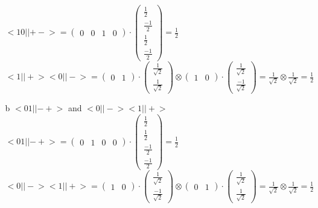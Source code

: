 \documentclass[11 pt]{article}
\theoremstyle{definition}
\theoremstyle{definition}
\def\ket#1{\big|{#1}\big>}
\def\bra#1{\big<{#1}\big|}
\begin{document}
\begin{enumerate}
\begin{enumerate}
$\bra{10}\ket{+-} = \left( \begin{array}{cccc}0&0&1&0\end{array}\right)\cdot\left( \begin{array}{c}\frac{1}{2}\\\frac{-1}{2}\\\frac{1}{2}\\\frac{-1}{2}\end{array}\right) = \frac{1}{2}$\\
$\bra{1}\ket{+}\bra{0}\ket{-} = \left( \begin{array}{cc}0&1\end{array}\right)\cdot\left( \begin{array}{c}\frac{1}{\sqrt{2}}\\\frac{1}{\sqrt{2}}\end{array}\right) \otimes \left( \begin{array}{cc}1&0\end{array}\right)\cdot\left( \begin{array}{c}\frac{1}{\sqrt{2}}\\\frac{-1}{\sqrt{2}}\end{array}\right) = \frac{1}{\sqrt{2}}\otimes\frac{1}{\sqrt{2}} = \frac{1}{2}$\\

\item[b] $\bra{01}\ket{-+}$ and $\bra{0}\ket{-}\bra{1}\ket{+}$\\
$\bra{01}\ket{-+} = \left( \begin{array}{cccc}0&1&0&0\end{array}\right)\cdot\left( \begin{array}{c}\frac{1}{2}\\\frac{1}{2}\\\frac{-1}{2}\\\frac{-1}{2}\end{array}\right) = \frac{1}{2}$\\
$\bra{0}\ket{-}\bra{1}\ket{+} = \left( \begin{array}{cc}1&0\end{array}\right)\cdot\left( \begin{array}{c}\frac{1}{\sqrt{2}}\\\frac{-1}{\sqrt{2}}\end{array}\right) \otimes \left( \begin{array}{cc}0&1\end{array}\right)\cdot\left( \begin{array}{c}\frac{1}{\sqrt{2}}\\\frac{1}{\sqrt{2}}\end{array}\right)  = \frac{1}{\sqrt{2}}\otimes\frac{1}{\sqrt{2}} = \frac{1}{2}$\\


\end{enumerate}
\end{enumerate}
\end{document}
